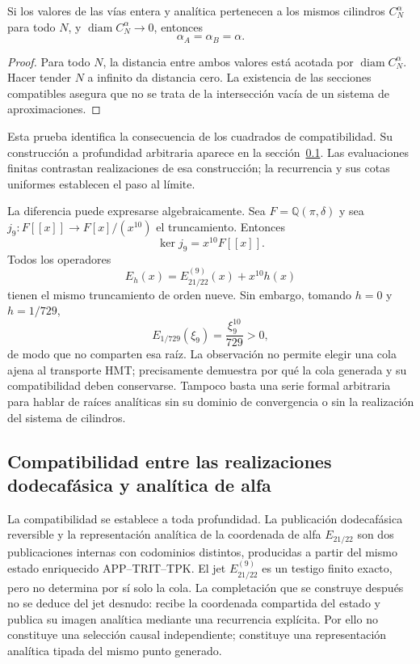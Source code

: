 \begin{proposition}
\label{x_reciprocidad:prop:alpha-dos-limites}
Si los valores de las vías entera y analítica pertenecen a los
mismos cilindros \(C_N^\alpha\) para todo \(N\), y
\(\operatorname{diam}C_N^\alpha\to0\), entonces
\[
 \alpha_A=\alpha_B=\alpha.
\]
\end{proposition}

\begin{proof}
Para todo \(N\), la distancia entre ambos valores está acotada
por \(\operatorname{diam}C_N^\alpha\). Hacer tender \(N\) a infinito
da distancia cero. La existencia de las secciones compatibles asegura
que no se trata de la intersección vacía de un sistema de aproximaciones.
\end{proof}

Esta prueba identifica la consecuencia de los cuadrados de compatibilidad.
Su construcción a profundidad arbitraria aparece en la
sección~\ref{x_reciprocidad:subsec:alpha-publicaciones-completas}. Las evaluaciones
finitas contrastan realizaciones de esa construcción; la recurrencia
y sus cotas uniformes establecen el paso al límite.

La diferencia puede expresarse algebraicamente. Sea
\(F=\mathbb Q(\pi,\delta)\) y sea
\(j_9:F[[x]]\to F[x]/(x^{10})\) el truncamiento. Entonces
\[
 \ker j_9=x^{10}F[[x]].
\]
Todos los operadores
\[
 E_h(x)=E_{21/22}^{(9)}(x)+x^{10}h(x)
\]
tienen el mismo truncamiento de orden nueve. Sin embargo, tomando
\(h=0\) y \(h=1/729\),
\[
 E_{1/729}(\xi_9)=\frac{\xi_9^{10}}{729}>0,
\]
de modo que no comparten esa raíz. La observación no permite elegir una
cola ajena al transporte HMT; precisamente demuestra por qué la cola
generada y su compatibilidad deben conservarse. Tampoco basta una serie
formal arbitraria para hablar de raíces analíticas sin su dominio de
convergencia o sin la realización del sistema de cilindros.

\subsection{Compatibilidad entre las realizaciones dodecafásica y analítica de alfa}
\label{x_reciprocidad:subsec:alpha-publicaciones-completas}

La compatibilidad se establece a toda profundidad. La publicación
dodecafásica reversible y la representación analítica de la
coordenada de alfa
\(E_{21/22}\) son dos publicaciones internas con codominios distintos,
producidas a partir del mismo estado enriquecido APP--TRIT--TPK. El jet
\(E_{21/22}^{(9)}\) es un testigo finito exacto, pero no determina por sí solo
la cola. La completación que se construye después no se deduce del jet
desnudo: recibe la coordenada compartida del estado y publica su imagen
analítica mediante una recurrencia explícita. Por ello no constituye una
selección causal independiente; constituye una representación analítica
tipada del mismo punto generado.

